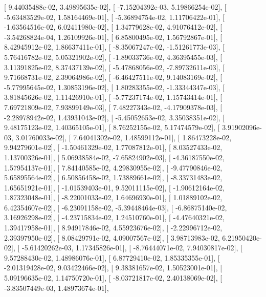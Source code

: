 \documentclass{article}
\begin{document}
       [  9.44035488e-02,   3.49895635e-02],
       [ -7.15204392e-03,   5.19866254e-02],
       [ -5.63483529e-02,   1.58164469e-01],
       [ -5.36894754e-02,   1.11706422e-01],
       [ -1.63564516e-02,   6.02411980e-02],
       [  1.34779628e-02,   4.91076412e-02],
       [ -3.54268824e-04,   1.26109926e-01],
       [  6.85800495e-02,   1.56792867e-01],
       [  8.42945912e-02,   1.86637411e-01],
       [ -8.35067247e-02,  -1.51261773e-03],
       [  5.76416782e-02,   5.05321902e-02],
       [ -1.89033736e-02,   4.36395455e-03],
       [  3.11391825e-02,   8.37437139e-02],
       [ -5.47868056e-02,  -7.89732611e-03],
       [  9.71668731e-02,   2.39064986e-02],
       [ -6.46427511e-02,   9.14083169e-02],
       [ -5.77995645e-02,   1.30853196e-02],
       [  1.80283355e-02,  -1.33344347e-03],
       [  3.81845626e-02,   1.11426910e-01],
       [ -5.77237174e-02,   1.15743414e-01],
       [  7.69721809e-02,   7.93899149e-03],
       [  7.48227343e-02,  -4.17909378e-03],
       [ -2.28978942e-02,   1.43931043e-02],
       [ -5.45052653e-02,   3.35038351e-02],
       [  9.48175123e-02,   1.40365105e-01],
       [  8.76252155e-02,   5.17474579e-02],
       [  3.91902096e-03,   3.01760033e-02],
       [  7.64041302e-02,   1.48599112e-01],
       [  1.86473228e-02,   9.94279601e-02],
       [ -1.50461329e-02,   1.77087812e-01],
       [  8.03527433e-02,   1.13700326e-01],
       [  5.06938584e-02,  -7.65824902e-03],
       [ -4.36187550e-02,   1.57954137e-01],
       [  7.84140585e-02,   4.29830955e-02],
       [ -9.47790846e-02,   5.65895564e-02],
       [  6.50856458e-02,   1.73889661e-02],
       [ -8.33731483e-02,   1.65651921e-01],
       [ -1.01539403e-01,   9.52011115e-02],
       [ -1.90612164e-02,   1.87323048e-01],
       [ -8.22001033e-02,   1.64696930e-01],
       [  1.01889102e-02,   6.42354607e-02],
       [ -6.23091158e-02,  -5.39448464e-03],
       [ -6.86875140e-02,   3.16926298e-02],
       [ -4.23715834e-02,   1.24510760e-01],
       [ -4.47640321e-02,   1.39417958e-01],
       [  8.94917846e-02,   4.55923676e-02],
       [ -2.22996712e-02,   2.39397950e-02],
       [  8.08429791e-02,   4.09007567e-02],
       [  3.98713983e-02,   6.21950420e-02],
       [ -5.61420262e-03,   1.17345826e-01],
       [ -8.76444071e-02,   7.94030817e-02],
       [  9.57288430e-02,   1.48986076e-01],
       [  6.87729410e-02,   1.85335355e-01],
       [ -2.01319428e-02,   9.03422466e-02],
       [  9.38381657e-02,   1.50523001e-01],
       [  5.09196635e-02,   1.14750720e-01],
       [ -8.03721817e-02,   2.40138069e-02],
       [ -3.83507449e-03,   1.48973674e-01],
\end{document}
